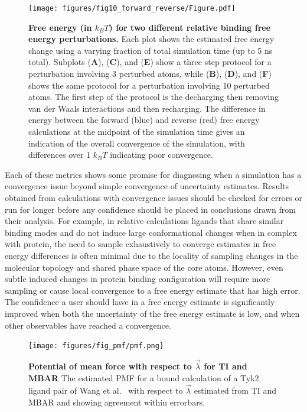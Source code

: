 \documentclass[9pt,bestpractices]{livecoms}
\begin{document}
\begin{figure}
    \centering
    \texttt{[image: figures/fig10\_forward\_reverse/Figure.pdf]}
    \caption{\textbf{Free energy (in $k_{B}T$) for two different relative binding free energy perturbations.} 
    Each plot shows the estimated free energy change using a varying fraction of total simulation time (up to 5 ns total). 
    Subplots (\textbf{A}), (\textbf{C}), and (\textbf{E}) show a three step protocol for a perturbation involving 3 perturbed atoms, while (\textbf{B}), (\textbf{D}), and (\textbf{F}) shows the same protocol for a perturbation involving 10 perturbed atoms. The first step of the protocol is the decharging then removing van der Waals interactions and then recharging. The difference in energy between the forward (blue) and reverse (red) free energy calculations at the midpoint of the simulation time gives an indication of the overall convergence of the simulation, with differences over 1 $k_{B}T$ indicating poor convergence.}
    \label{fig:convergence_forward_reverse}
\end{figure}

Each of these metrics shows some promise for diagnosing when a simulation has a convergence issue beyond simple convergence of uncertainty estimates. 
Results obtained from calculations with convergence issues should be checked for errors or run for longer before any confidence should be placed in conclusions drawn from their analysis.
For example, in relative calculations ligands that share similar binding modes and do not induce large conformational changes when in complex with protein, the need to sample exhaustively to converge estimates in free energy differences is often minimal due to the locality of sampling changes in the molecular topology and shared phase space of the core atoms.
However, even subtle induced changes in protein binding configuration will require more sampling or cause local convergence to a free energy estimate that has high error.
The confidence a user should have in a free energy estimate is significantly improved when both the uncertainty of the free energy estimate is low, and when other observables have reached a convergence.

\begin{figure}
    \centering
    \texttt{[image: figures/fig\_pmf/pmf.png]}
    \caption{{\bf Potential of mean force with respect to $\vec{\lambda}$ for TI and MBAR}
    The estimated PMF for a bound calculation of a Tyk2 ligand pair of Wang et al.~\cite{wang2015accurate} with respect to $\vec{\lambda}$ estimated from TI and MBAR and showing agreement within errorbars. 
    }
    \label{fig:pmf}
\end{figure}
\end{document}
